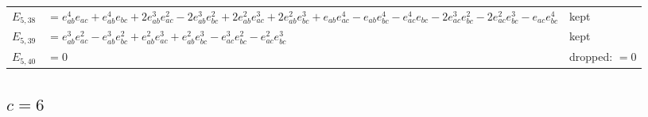 \documentclass[10pt]{article}
\begin{document}
\begin{longtable}{r>{\raggedright\arraybackslash}p{}>{\raggedright\arraybackslash}p{}}
$E_{5,38}$ & $= e_{ab}^{4} e_{ac} + e_{ab}^{4} e_{bc} + 2 e_{ab}^{3} e_{ac}^{2} - 2 e_{ab}^{3} e_{bc}^{2} + 2 e_{ab}^{2} e_{ac}^{3} + 2 e_{ab}^{2} e_{bc}^{3} + e_{ab} e_{ac}^{4} - e_{ab} e_{bc}^{4} - e_{ac}^{4} e_{bc} - 2 e_{ac}^{3} e_{bc}^{2} - 2 e_{ac}^{2} e_{bc}^{3} - e_{ac} e_{bc}^{4}$ & kept \\
$E_{5,39}$ & $= e_{ab}^{3} e_{ac}^{2} - e_{ab}^{3} e_{bc}^{2} + e_{ab}^{2} e_{ac}^{3} + e_{ab}^{2} e_{bc}^{3} - e_{ac}^{3} e_{bc}^{2} - e_{ac}^{2} e_{bc}^{3}$ & kept \\
$E_{5,40}$ & $= 0$ & dropped: $= 0$ \\
\end{longtable}

\subsection*{$c = 6$}
\end{document}
